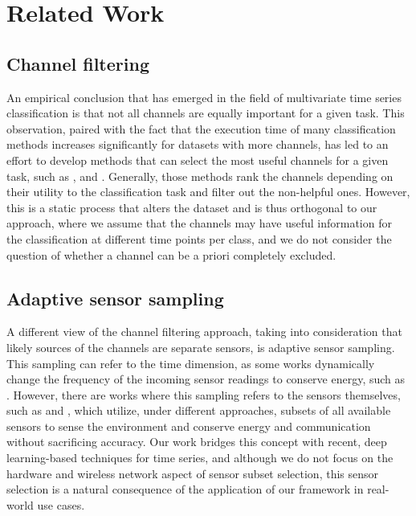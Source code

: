 \documentclass[conference]{IEEEtran}
\begin{document}
\section{Related Work}

\subsection{Channel filtering}

An empirical conclusion that has emerged in the field of multivariate time series classification is that not all channels are equally important for a given task\cite{kathirgamanathan2020feature,dhariyal2021fast}. This observation, paired with the fact that the execution time of many classification methods increases significantly for datasets with more channels\cite{ruizGreatMultivariateTime2021}, has led to an effort to develop methods that can select the most useful channels for a given task, such as \cite{yoon2005featuresubset}, \cite{kathirgamanathan2020feature} and \cite{dhariyal2021fast}. Generally, those methods rank the channels depending on their utility to the classification task and filter out the non-helpful ones. However, this is a static process that alters the dataset and is thus orthogonal to our approach, where we assume that the channels may have useful information for the classification at different time points per class, and we do not consider the question of whether a channel can be a priori completely excluded.

\subsection{Adaptive sensor sampling}

A different view of the channel filtering approach, taking into consideration that likely sources of the channels are separate sensors, is adaptive sensor sampling. This sampling can refer to the time dimension, as some works dynamically change the frequency of the incoming sensor readings to conserve energy, such as \cite{alippi2010samplingenergyhungry}. However, there are works where this sampling refers to the sensors themselves, such as \cite{willett2004backcasting} and \cite{gedik2007asap}, which utilize, under different approaches, subsets of all available sensors to sense the environment and conserve energy and communication without sacrificing accuracy. Our work bridges this concept with recent, deep learning-based techniques for time series, and although we do not focus on the hardware and wireless network aspect of sensor subset selection, this sensor selection is a natural consequence of the application of our framework in real-world use cases.
\end{document}
